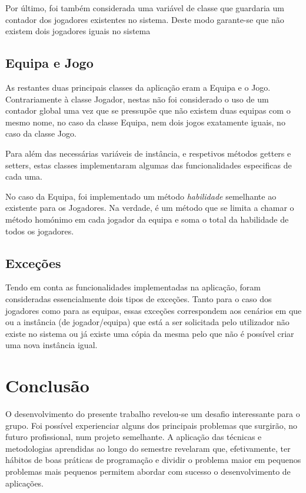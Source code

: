 \documentclass[11pt]{article}
\begin{document}
Por último, foi também considerada uma variável de classe que guardaria um contador dos jogadores existentes no sistema. Deste modo garante-se que não existem dois jogadores iguais no sistema

\subsection{Equipa e Jogo}

As restantes duas principais classes da aplicação eram a Equipa e o Jogo. Contrariamente à classe Jogador, nestas não foi considerado o uso de um contador global uma vez que se pressupõe que não existem duas equipas com o mesmo nome, no caso da classe Equipa, nem dois jogos exatamente iguais, no caso da classe Jogo.

Para além das necessárias variáveis de instância, e respetivos métodos getters e setters, estas classes implementaram algumas das funcionalidades especificas de cada uma.

No caso da Equipa, foi implementado um método \textit{habilidade} semelhante ao existente para os Jogadores. Na verdade, é um método que se limita a chamar o método homónimo em cada jogador da equipa e soma o total da habilidade de todos os jogadores.


\subsection{Exceções}

Tendo em conta as funcionalidades implementadas na aplicação, foram consideradas essencialmente dois tipos de exceções. Tanto para o caso dos jogadores como para as equipas, essas exceções correspondem aos cenários em que ou a instância (de jogador/equipa) que está a ser solicitada pelo utilizador não existe no sistema ou já existe uma cópia da mesma pelo que não é possível criar uma nova instância igual.

\section{Conclusão}

O desenvolvimento do presente trabalho revelou-se um desafio interessante para o grupo. Foi possível experienciar alguns dos principais problemas que surgirão, no futuro profissional, num projeto semelhante. A aplicação das técnicas e metodologias aprendidas ao longo do semestre revelaram que, efetivamente, ter hábitos de boas práticas de programação e dividir o problema maior em pequenos problemas mais pequenos permitem abordar com sucesso o desenvolvimento de aplicações.
\end{document}

